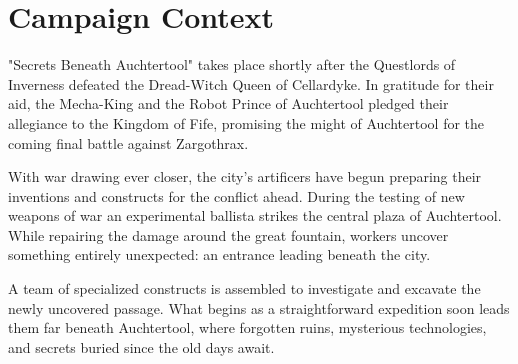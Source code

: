 \section*{\LARGE Campaign Context}
{\entryfont "Secrets Beneath Auchtertool" takes place shortly after the Questlords of Inverness defeated the Dread-Witch Queen of Cellardyke. In gratitude for their aid, the Mecha-King and the Robot Prince of Auchtertool pledged their allegiance to the Kingdom of Fife, promising the might of Auchtertool for the coming final battle against Zargothrax.

	With war drawing ever closer, the city's artificers have begun preparing their inventions and constructs for the conflict ahead. During the testing of new weapons of war an experimental ballista strikes the central plaza of Auchtertool. While repairing the damage around the great fountain, workers uncover something entirely unexpected: an entrance leading beneath the city.

	A team of specialized constructs is assembled to investigate and excavate the newly uncovered passage. What begins as a straightforward expedition soon leads them far beneath Auchtertool, where forgotten ruins, mysterious technologies, and secrets buried since the old days await.}